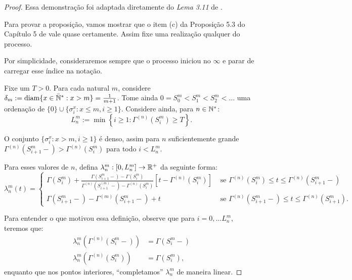 \begin{proof}
  Essa demonstração foi adaptada diretamente do \emph{Lema 3.11} de
  \cite{fontes:08}.

  Para provar a proposição, vamos mostrar que o item (c) da Proposição
  5.3 do Capítulo 5 de \cite{ethier:86} vale quase certamente. Assim
  fixe uma realização qualquer do processo.

  Por simplicidade, consideraremos sempre que o processo iniciou no
  $\infty$ e parar de carregar esse índice na notação.

  Fixe um $T > 0$. Para cada natural $m$, considere $\delta_m :=
  {\mathrm{diam}}\{ x \in {\mathbb{\bar{N}^*}}: x > m \} = \frac{1}{m+1}$. Tome ainda $0 = S_0^m
  < S_1^m < S_2^m < \ldots $ uma ordenação de $\{0\}\cup\{ \sigma^x_i
  : x \leq m, i \geq 1\}$. Considere ainda, para $n \in {\mathbb{N^*}}$:
  \begin{displaymath}
    L^m_n := \min \left\{ i \geq 1: \Gamma^{(n)}(S^m_i) \geq T \right\}.
  \end{displaymath}

  O conjunto $\{\sigma_i^x: x > m, i\geq 1\}$ é denso, assim para $n$
  suficientemente grande $\Gamma^{(n)}(S^m_{i+1}-) >
  \Gamma^{(n)}(S^m_i)$ para todo $i < L^m_n$.

  Para esses valores de $n$, defina $\lambda_n^m: [0, L_n^m] \to {\mathbb{R}}^+$
  da seguinte forma:
  \begin{displaymath}
    \lambda_n^m(t) = \begin{cases}
      \Gamma(S_i^m) + \frac{\Gamma(S_{i+1}^m-) - \Gamma(S_i^m)}
      {\Gamma^{(n)}(S_{i+1}^{(m)} -) - \Gamma^{(n)}(S_i^m)}
      \left[t - \Gamma^{(n)}(S_i^m)\right]
      & \textrm{ se }
      \Gamma^{(n)}(S_i^m) \leq t \leq \Gamma^{(n)}(S_{i+1}^m-) \\
      \Gamma(S_{i+1}^m-) - \Gamma^{(m)}(S_{i+1}^m-) + t
      & \textrm{ se }
      \Gamma^{(n)}(S_{i+1}^m-) \leq t \leq \Gamma^{(n)}(S_{i+1}^m).
    \end{cases}
  \end{displaymath}

  Para entender o que motivou essa definição, observe que para $i = 0,
  \ldots L_n^m$, teremos que:
  \begin{align*}
    \lambda_n^m(\Gamma^{(n)}(S_i^m-)) &= \Gamma(S_i^m-)\\
    \lambda_n^m(\Gamma^{(n)}(S_i^m)) &= \Gamma(S_i^m),
  \end{align*}
  enquanto que nos pontos interiores, ``completamos'' $\lambda_n^m$ de
  maneira linear.


\end{proof}

